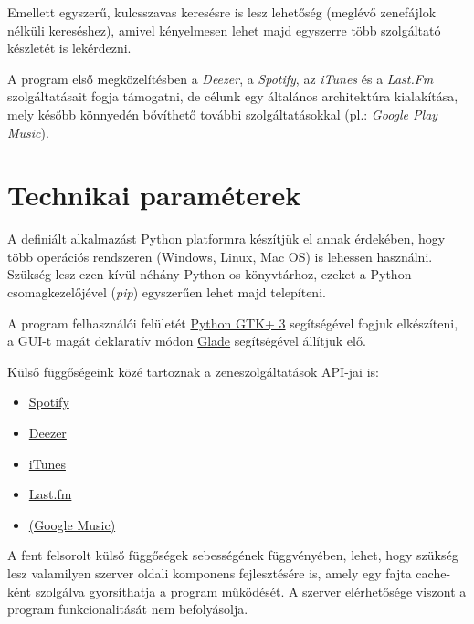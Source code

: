 Emellett egyszerű, kulcsszavas keresésre is lesz lehetőség (meglévő zenefájlok nélküli kereséshez), amivel kényelmesen lehet majd egyszerre több szolgáltató készletét is lekérdezni.

A program első megközelítésben a \textit{Deezer}, a \textit{Spotify}, az \textit{iTunes} és a \textit{Last.Fm} szolgáltatásait fogja támogatni, de célunk egy általános architektúra kialakítása, mely később könnyedén bővíthető további szolgáltatásokkal (pl.: \textit{Google Play Music}).


\section{Technikai paraméterek}
\label{sec:technikaiparameterek}

A definiált alkalmazást Python platformra készítjük el annak érdekében, hogy több operációs rendszeren (Windows, Linux, Mac OS) is lehessen használni.  Szükség lesz ezen kívül néhány Python-os könyvtárhoz, ezeket a Python csomagkezelőjével (\textit{pip}) egyszerűen lehet majd telepíteni.

A program felhasználói felületét \href{http://python-gtk-3-tutorial.readthedocs.org/en/latest/}{Python GTK+ 3} segítségével fogjuk elkészíteni, a GUI-t magát deklaratív módon \href{https://glade.gnome.org/}{Glade} segítségével állítjuk elő.

Külső függőségeink közé tartoznak a zeneszolgáltatások API-jai is:

\begin{itemize}
	\item \href{https://developer.spotify.com/web-api/}{Spotify}
    \item \href{http://developers.deezer.com/api/}{Deezer}
    \item \href{https://www.apple.com/itunes/affiliates/resources/documentation/itunes-store-web-service-search-api.html}{iTunes}
    \item \href{http://www.last.fm/api}{Last.fm}
    \item \href{http://unofficial-google-music-api.readthedocs.org/en/latest/}{(Google Music)}
\end{itemize}

A fent felsorolt külső függőségek sebességének függvényében, lehet, hogy szükség lesz valamilyen szerver oldali komponens fejlesztésére is, amely egy fajta cache-ként szolgálva gyorsíthatja a program működését. A szerver elérhetősége viszont a program funkcionalitását nem befolyásolja.

